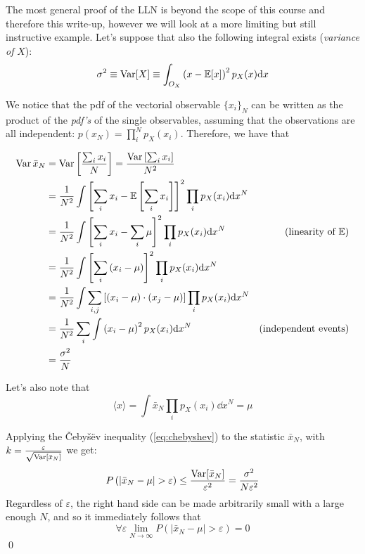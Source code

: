 \begin{example}
The most general proof of the LLN is beyond the scope of this course and therefore this write-up, however we will look at a more limiting but still instructive example. Let's suppose that also the following integral exists (\emph{variance of} $X$):
	\[
	\sigma^2 \equiv \operatorname{Var}[X] \equiv \int_{O_X}\left( x-\mathbb{E}[x]\right)^2p_X(x)\mathrm{d} x
	\] 

	We notice that the pdf of the vectorial observable $\{x_i\}_N$ can be written as the product of the \emph{pdf's} of the single observables, assuming that the observations are all independent: $p(x_N)=\prod_i^N p_X(x_i)$. Therefore, we have that

\begin{align*}
	\operatorname{Var}{\bar{x}_N} &= \operatorname{Var}\left[ \frac{\sum_i x_i}{N} \right] = \frac{\operatorname{Var}\left[ \sum_i x_i \right]}{N^2} \\
	&= \frac{1}{N^2}\int\left[ \sum_i x_i - \mathbb{E}\left[ \sum_i x_i \right] \right]^2\prod_i p_X(x_i)\mathrm{d} x^N \\ 
	&= \frac{1}{N^2}\int\left[ \sum_i x_i - \sum_i \mu \right]^2\prod_i p_X(x_i)\mathrm{d} x^N & \text{(linearity of $\mathbb{E}$)}\\ 
	&= \frac{1}{N^2}\int\left[ \sum_i \left( x_i - \mu \right) \right]^2\prod_i p_X(x_i)\mathrm{d} x^N \\
	&= \frac{1}{N^2}\int \sum_{i,j}\left[\left( x_i - \mu \right)\cdot\left( x_j - \mu \right)\right]\prod_i p_X(x_i)\mathrm{d} x^N\\
	&= \frac{1}{N^2}\sum_{i}\int \left( x_i - \mu \right)^2p_X(x_i)\mathrm{d} x^N & \text{(independent events)}\\
	&= \frac{\sigma^2}{N}
\end{align*}

Let's also note that
	\[
	\langle x \rangle = \int \bar{x}_N \prod_i p_X(x_i)\dd x^N = \mu
	\]
	
Applying the Čebyšëv inequality (\ref{eq:chebyshev}) to the statistic $\bar{x}_N$, with $k=\frac{\varepsilon}{\sqrt{\operatorname{Var}[{\bar{x}_N}]}}$ we get:
	\[
	P\left( \left| \bar{x}_N-\mu \right| > \varepsilon\right) \leq \frac{\operatorname{Var}[{\bar{x}_N}]}{\varepsilon^2} = \frac{\sigma^2}{N\varepsilon^2} 
	\]
Regardless of $\varepsilon$, the right hand side can be made arbitrarily small with a large enough $N$, and so it immediately follows that
	\[
	\forall \varepsilon \lim_{N\to\infty} P\left( \left| \bar{x}_N-\mu \right| > \varepsilon\right)= 0 
	\]
	\qed
\end{example}

